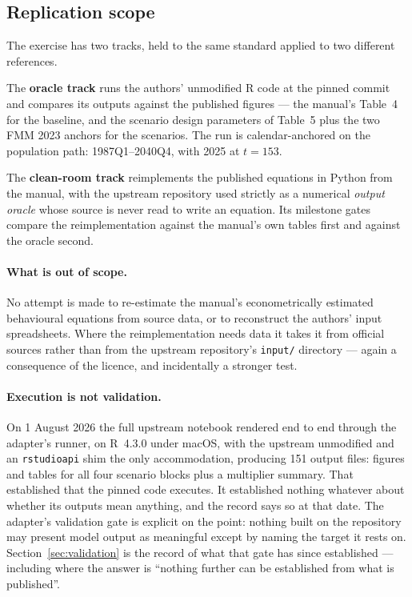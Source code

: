 \subsection{Replication scope}

The exercise has two tracks, held to the same standard applied to two different references.

The \textbf{oracle track} runs the authors' unmodified R code at the pinned commit and compares its outputs against the published figures --- the manual's Table~4 for the baseline, and the scenario design parameters of Table~5 plus the two FMM 2023 anchors for the scenarios. The run is calendar-anchored on the population path: 1987Q1--2040Q4, with 2025 at $t=153$.

The \textbf{clean-room track} reimplements the published equations in Python from the manual, with the upstream repository used strictly as a numerical \emph{output oracle} whose source is never read to write an equation. Its milestone gates compare the reimplementation against the manual's own tables first and against the oracle second.

\paragraph{What is out of scope.} No attempt is made to re-estimate the manual's econometrically estimated behavioural equations from source data, or to reconstruct the authors' input spreadsheets. Where the reimplementation needs data it takes it from official sources rather than from the upstream repository's \texttt{input/} directory --- again a consequence of the licence, and incidentally a stronger test.

\paragraph{Execution is not validation.} On 1 August 2026 the full upstream notebook rendered end to end through the adapter's runner, on R~4.3.0 under macOS, with the upstream unmodified and an \texttt{rstudioapi} shim the only accommodation, producing 151 output files: figures and tables for all four scenario blocks plus a multiplier summary. That established that the pinned code executes. It established nothing whatever about whether its outputs mean anything, and the record says so at that date. The adapter's validation gate is explicit on the point: nothing built on the repository may present model output as meaningful except by naming the target it rests on. Section~\ref{sec:validation} is the record of what that gate has since established --- including where the answer is ``nothing further can be established from what is published''.
